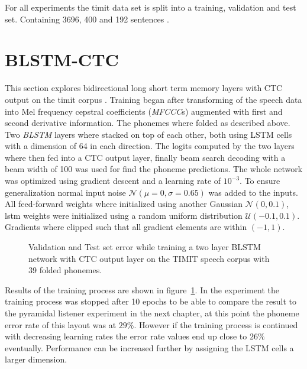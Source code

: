 For all experiments the timit data set is split into a training, validation and test set. Containing 3696, 400 and 192 sentences \cite[page  80]{Graves2012}.


\section{BLSTM-CTC}
This section explores bidirectional long short term memory layers with CTC output on the timit corpus \cite{Graves2012, Graves2006}. Training began after transforming of the speech data into Mel frequency cepstral coefficients (\textit{MFCCC}s) augmented with first and second derivative information. The phonemes where folded as described above. Two \textit{BLSTM} layers where stacked on top of each other, both using LSTM cells with a dimension of 64 in each direction. The logits computed by the two layers where then fed into a CTC output layer, finally beam search decoding with a beam width of 100 was used for find the phoneme predictions. The whole network was optimized using gradient descent and a learning rate of $10^{-3}$. To ensure generalization normal input noise $\mathcal{N}(\mu = 0,\sigma = 0.65)$ was added to the inputs. All feed-forward weights where initialized using another Gaussian $\mathcal{N}(0, 0.1)$, lstm weights were initialized using a random uniform distribution $\mathcal{U}(-0.1, 0.1)$. Gradients where clipped such that all gradient elements are within $(-1,1)$.
\begin{figure}
\centering


\caption{Validation and Test set error while training a two layer BLSTM network with CTC output layer on the TIMIT speech corpus with 39 folded phonemes.}
\label{fig:ctc2BLSTM41}
\end{figure}
Results of the training process are shown in figure~\ref*{fig:ctc2BLSTM41}. In the experiment the training process was stopped after 10 epochs to be able to compare the result to the pyramidal listener experiment in the next chapter, at this point the phoneme error rate of this layout was at $29\%$. However if the training process is continued with decreasing learning rates the error rate values end up close to $26\%$ eventually. Performance can be increased further by assigning the LSTM cells a larger dimension.

